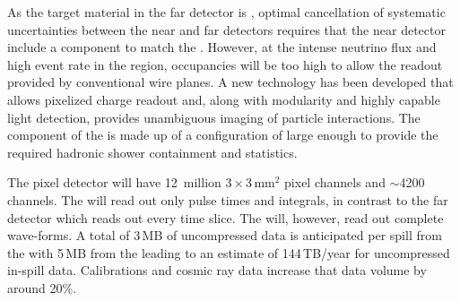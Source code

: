 \documentclass[../main-v1.tex]{subfiles}
\begin{document}
 As the target material in the %
 far detector is , optimal cancellation of systematic uncertainties between the near and far detectors requires that the near detector include a   component to match the .  However, at the intense neutrino flux and high event rate in the  region, occupancies will be too high to allow the \twod readout provided by conventional wire planes. A new   technology has been developed that allows pixelized charge readout and, along with modularity and highly capable light detection, provides unambiguous \threed imaging of  particle interactions.  The  component of the  is made up of a configuration of     large enough to provide the required hadronic shower containment and statistics.  %
 
 The pixel  detector will have 12~million $3 \times 3$\,mm$^2$ pixel channels and $\sim$4200  channels.  The  will read out only pulse times and integrals, in contrast to the far detector which reads out every time slice.  The  will, however, read out complete wave-forms.   A total of 3\,MB of uncompressed data is anticipated per spill from the  with 5\,MB from the  leading to an estimate of 144\,TB/year for uncompressed in-spill data. Calibrations and cosmic ray data increase that data volume by around 20\%.


\end{document}
